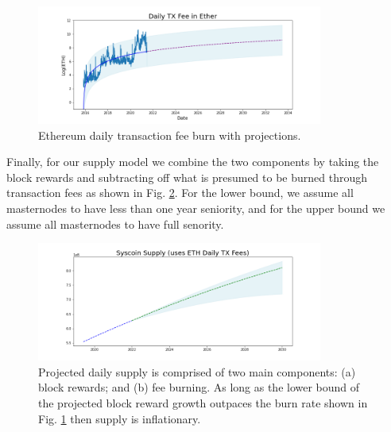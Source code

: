 \documentclass[peerreview]{ieeesyscoin}
\begin{document}
\begin{figure}[h!]
\includegraphics[width=3.7in]{img/eth_daily_tx_fee.png}
\caption{Ethereum daily transaction fee burn with projections.} 
\label{fig:tx_burn}
\end{figure} 

Finally, for our supply model we combine the two components by taking the block rewards and subtracting off what is presumed to be burned through transaction fees as shown in Fig. \ref{fig:tx_delay}. For the lower bound, we assume all masternodes to have less than one year seniority, and for the upper bound   we assume all masternodes to have full senority.

\begin{figure}[h!]
\includegraphics[width=3.7in]{img/syscoin_daily_supply.png}
\caption{Projected daily supply is comprised of two main components: (a) block rewards; and (b) fee burning. As long as the lower bound of the projected block reward growth outpaces the burn rate shown in Fig. \ref{fig:tx_burn} then supply is inflationary.} 
\label{fig:tx_delay}
\end{figure} 
\end{document}
